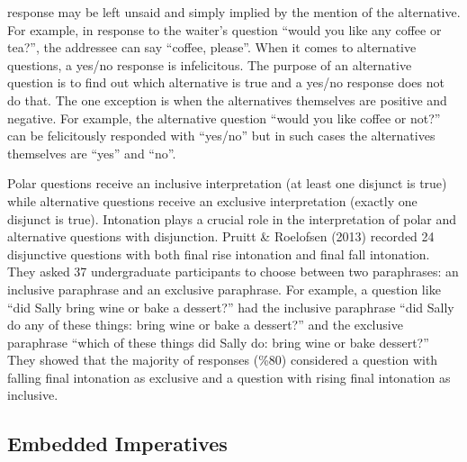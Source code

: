 \documentclass[oneside]{report}
\theoremstyle{definition}
\theoremstyle{definition}
\theoremstyle{definition}
\theoremstyle{remark}
\begin{document}
response may be left unsaid and simply implied by the mention of the
alternative. For example, in response to the waiter's question ``would
you like any coffee or tea?'', the addressee can say ``coffee, please''.
When it comes to alternative questions, a yes/no response is
infelicitous. The purpose of an alternative question is to find out
which alternative is true and a yes/no response does not do that. The
one exception is when the alternatives themselves are positive and
negative. For example, the alternative question ``would you like coffee
or not?'' can be felicitously responded with ``yes/no'' but in such
cases the alternatives themselves are ``yes'' and ``no''.

Polar questions receive an inclusive interpretation (at least one
disjunct is true) while alternative questions receive an exclusive
interpretation (exactly one disjunct is true). Intonation plays a
crucial role in the interpretation of polar and alternative questions
with disjunction. Pruitt \& Roelofsen (2013) recorded 24 disjunctive
questions with both final rise intonation and final fall intonation.
They asked 37 undergraduate participants to choose between two
paraphrases: an inclusive paraphrase and an exclusive paraphrase. For
example, a question like ``did Sally bring wine or bake a dessert?'' had
the inclusive paraphrase ``did Sally do any of these things: bring wine
or bake a dessert?'' and the exclusive paraphrase ``which of these
things did Sally do: bring wine or bake dessert?'' They showed that the
majority of responses (\%80) considered a question with falling final
intonation as exclusive and a question with rising final intonation as
inclusive.

\subsection{Embedded Imperatives}\label{embedded-imperatives}
\end{document}
